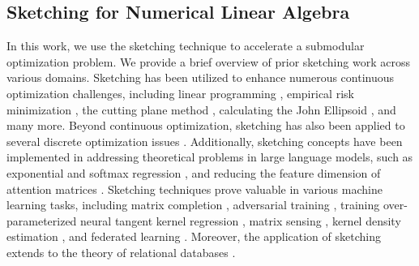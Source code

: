 \subsection{Sketching for Numerical Linear Algebra}
In this work, we use the sketching technique to accelerate a submodular optimization problem. We provide a brief overview of prior sketching work across various domains. Sketching has been utilized to enhance numerous continuous optimization challenges, including linear programming \cite{cls19,song19,b20,jswz21,sy21,gs22}, empirical risk minimization \cite{lsz19,qszz23}, the cutting plane method \cite{jlsw20}, calculating the John Ellipsoid \cite{ccly19,syyz22}, and many more.
Beyond continuous optimization, sketching has also been applied to several discrete optimization issues \cite{dsw22,sxz22,z22,jlsz23}. Additionally, sketching concepts have been implemented in addressing theoretical problems in large language models, such as exponential and softmax regression \cite{lsz23,gsy23,dls23_softmax,llss24}, and reducing the feature dimension of attention matrices \cite{dms23}. Sketching techniques prove valuable in various machine learning tasks, including matrix completion \cite{gsyz23}, adversarial training \cite{gqsw22}, training over-parameterized neural tangent kernel regression \cite{bpsw21,szz21,z22,als+22,hswz22}, matrix sensing \cite{dls23_sensing,qsz23}, kernel density estimation \cite{qrs+22}, and federated learning \cite{swyz23}. Moreover, the application of sketching extends to the theory of relational databases \cite{qjs+22}.